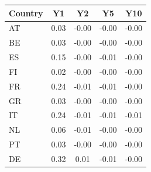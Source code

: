 \begin{tabular}{lcccc}
\toprule
Country & Y1 & Y2 & Y5 & Y10 \\
\midrule
AT & 0.03 & -0.00 & -0.00 & -0.00 \\
BE & 0.03 & -0.00 & -0.00 & -0.00 \\
ES & 0.15 & -0.00 & -0.01 & -0.00 \\
FI & 0.02 & -0.00 & -0.00 & -0.00 \\
FR & 0.24 & -0.01 & -0.01 & -0.00 \\
GR & 0.03 & -0.00 & -0.00 & -0.00 \\
IT & 0.24 & -0.01 & -0.01 & -0.01 \\
NL & 0.06 & -0.01 & -0.00 & -0.00 \\
PT & 0.03 & -0.00 & -0.00 & -0.00 \\
DE & 0.32 & 0.01 & -0.01 & -0.00 \\
\bottomrule
\end{tabular}
